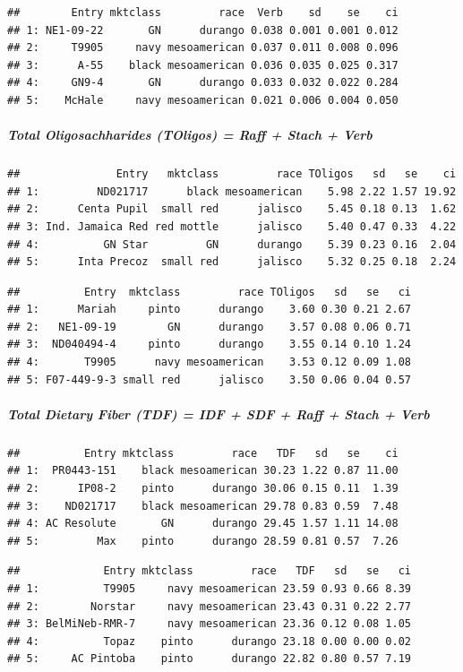 \documentclass[11pt,]{article}
\begin{document}
\begin{verbatim}
##        Entry mktclass         race  Verb    sd    se    ci
## 1: NE1-09-22       GN      durango 0.038 0.001 0.001 0.012
## 2:     T9905     navy mesoamerican 0.037 0.011 0.008 0.096
## 3:      A-55    black mesoamerican 0.036 0.035 0.025 0.317
## 4:     GN9-4       GN      durango 0.033 0.032 0.022 0.284
## 5:    McHale     navy mesoamerican 0.021 0.006 0.004 0.050
\end{verbatim}

\subparagraph{Total Oligosachharides (TOligos) = Raff + Stach +
Verb}\label{total-oligosachharides-toligos-raff-stach-verb}

\begin{verbatim}
##               Entry   mktclass         race TOligos   sd   se    ci
## 1:         ND021717      black mesoamerican    5.98 2.22 1.57 19.92
## 2:      Centa Pupil  small red      jalisco    5.45 0.18 0.13  1.62
## 3: Ind. Jamaica Red red mottle      jalisco    5.40 0.47 0.33  4.22
## 4:          GN Star         GN      durango    5.39 0.23 0.16  2.04
## 5:      Inta Precoz  small red      jalisco    5.32 0.25 0.18  2.24
\end{verbatim}

\begin{verbatim}
##          Entry  mktclass         race TOligos   sd   se   ci
## 1:      Mariah     pinto      durango    3.60 0.30 0.21 2.67
## 2:   NE1-09-19        GN      durango    3.57 0.08 0.06 0.71
## 3:  ND040494-4     pinto      durango    3.55 0.14 0.10 1.24
## 4:       T9905      navy mesoamerican    3.53 0.12 0.09 1.08
## 5: F07-449-9-3 small red      jalisco    3.50 0.06 0.04 0.57
\end{verbatim}

\subparagraph{Total Dietary Fiber (TDF) = IDF + SDF + Raff + Stach +
Verb}\label{total-dietary-fiber-tdf-idf-sdf-raff-stach-verb}

\begin{verbatim}
##          Entry mktclass         race   TDF   sd   se    ci
## 1:  PR0443-151    black mesoamerican 30.23 1.22 0.87 11.00
## 2:      IP08-2    pinto      durango 30.06 0.15 0.11  1.39
## 3:    ND021717    black mesoamerican 29.78 0.83 0.59  7.48
## 4: AC Resolute       GN      durango 29.45 1.57 1.11 14.08
## 5:         Max    pinto      durango 28.59 0.81 0.57  7.26
\end{verbatim}

\begin{verbatim}
##             Entry mktclass         race   TDF   sd   se   ci
## 1:          T9905     navy mesoamerican 23.59 0.93 0.66 8.39
## 2:        Norstar     navy mesoamerican 23.43 0.31 0.22 2.77
## 3: BelMiNeb-RMR-7     navy mesoamerican 23.36 0.12 0.08 1.05
## 4:          Topaz    pinto      durango 23.18 0.00 0.00 0.02
## 5:     AC Pintoba    pinto      durango 22.82 0.80 0.57 7.19
\end{verbatim}
\end{document}
